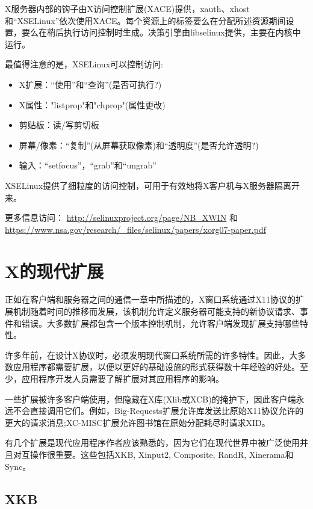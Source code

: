 X服务器内部的钩子由X访问控制扩展(XACE)提供，xauth、xhost和“XSELinux”依次使用XACE。每个资源上的标签要么在分配所述资源期间设置，要么在稍后执行访问控制时生成。决策引擎由libselinux提供，主要在内核中运行。

\noindent 最值得注意的是，XSELinux可以控制访问:

\vspace{-5mm}

\begin{itemize}
	\item X扩展：“使用”和“查询”(是否可执行?)
	\item X属性："listprop"和"chprop"(属性更改)
	\item 剪贴板：读/写剪切板
	\item 屏幕/像素：“复制”(从屏幕获取像素)和“透明度”(是否允许透明?)
	\item 输入：“setfocus”，“grab”和“ungrab”
\end{itemize}

XSELinux提供了细粒度的访问控制，可用于有效地将X客户机与X服务器隔离开来。

\noindent 更多信息访问：
\href{http://selinuxproject.org/page/NB_XWIN}{http://selinuxproject.org/page/NB\_XWIN}
和
\href{https://www.nsa.gov/research/_files/selinux/papers/xorg07-paper.pdf}{https://www.nsa.gov/research/\_files/selinux/papers/xorg07-paper.pdf}

\section{X的现代扩展}

正如在客户端和服务器之间的通信一章中所描述的，X窗口系统通过X11协议的扩展机制随着时间的推移而发展，该机制允许定义服务器可能支持的新协议请求、事件和错误。大多数扩展都包含一个版本控制机制，允许客户端发现扩展支持哪些特性。

许多年前，在设计X协议时，必须发明现代窗口系统所需的许多特性。因此，大多数应用程序都需要扩展，以便以更好的基础设施的形式获得数十年经验的好处。至少，应用程序开发人员需要了解扩展对其应用程序的影响。

一些扩展被许多客户端使用，但隐藏在X库(Xlib或XCB)的掩护下，因此客户端永远不会直接调用它们。例如，Big-Requests扩展允许库发送比原始X11协议允许的更大的请求消息;XC-MISC扩展允许图书馆在原始分配耗尽时请求XID。

有几个扩展是现代应用程序作者应该熟悉的，因为它们在现代世界中被广泛使用并且对互操作很重要。这些包括XKB, Xinput2, Composite, RandR, Xinerama和Sync。

\subsection{XKB}

